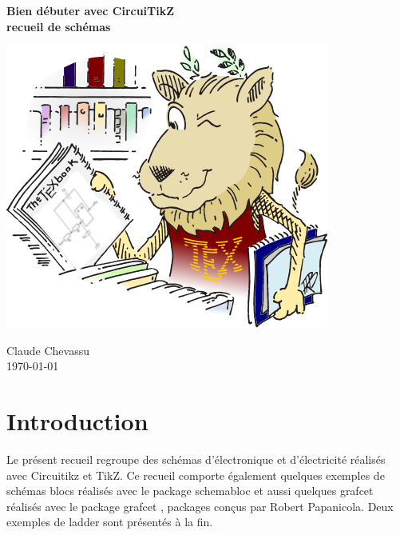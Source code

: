 \documentclass[10pt]{article}
\begin{document}
\begin{titlepage}

  \begin{sffamily}
  \begin{center}

  
    { \huge \bfseries  Bien débuter avec CircuiTikZ \\
   \vspace{1cm}
    recueil de schémas }
    
    \vspace{4cm}

    \includegraphics[scale=1.1]{ctanlion2.jpg}
  
    \vfill

   \end{center}
  
  
      \begin{flushright} \large Claude Chevassu\\
      \today
      \end{flushright}
  \end{sffamily}
  
\end{titlepage}



\tableofcontents


\newpage



\section{Introduction}

Le présent recueil regroupe des schémas d'électronique et d'électricité réalisés avec Circuitikz et TikZ. Ce recueil comporte également quelques exemples de schémas blocs réalisés avec le package \og schemabloc \fg{} et aussi quelques grafcet réalisés avec le package \og grafcet \fg{}, packages conçus par Robert Papanicola. Deux exemples de \og ladder \fg sont présentés à la fin.
\end{document}
